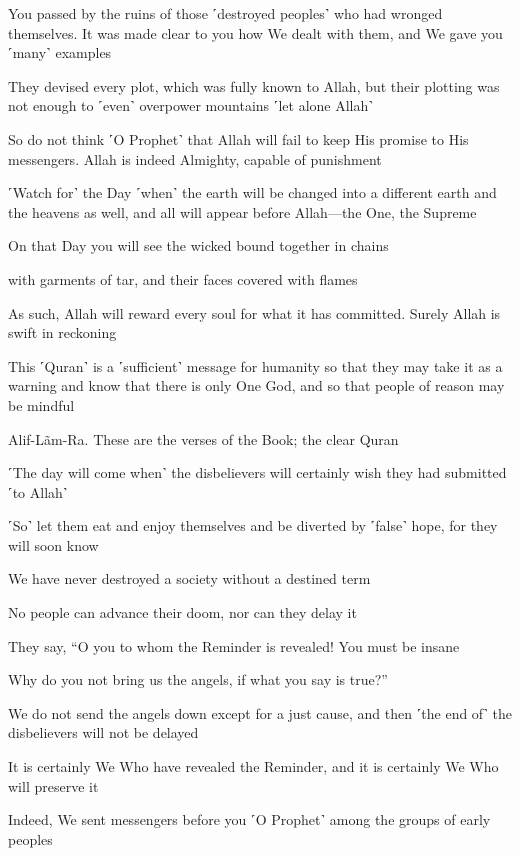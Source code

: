 You passed by the ruins of those ˹destroyed peoples˺ who had wronged themselves. It was made clear to you how We dealt with them, and We gave you ˹many˺ examples

They devised every plot, which was fully known to Allah, but their plotting was not enough to ˹even˺ overpower mountains ˹let alone Allah˺

So do not think ˹O Prophet˺ that Allah will fail to keep His promise to His messengers. Allah is indeed Almighty, capable of punishment

˹Watch for˺ the Day ˹when˺ the earth will be changed into a different earth and the heavens as well, and all will appear before Allah—the One, the Supreme

On that Day you will see the wicked bound together in chains

with garments of tar, and their faces covered with flames

As such, Allah will reward every soul for what it has committed. Surely Allah is swift in reckoning

This ˹Quran˺ is a ˹sufficient˺ message for humanity so that they may take it as a warning and know that there is only One God, and so that people of reason may be mindful

Alif-Lãm-Ra. These are the verses of the Book; the clear Quran

˹The day will come when˺ the disbelievers will certainly wish they had submitted ˹to Allah˺

˹So˺ let them eat and enjoy themselves and be diverted by ˹false˺ hope, for they will soon know

We have never destroyed a society without a destined term

No people can advance their doom, nor can they delay it

They say, “O you to whom the Reminder is revealed! You must be insane

Why do you not bring us the angels, if what you say is true?”

We do not send the angels down except for a just cause, and then ˹the end of˺ the disbelievers will not be delayed

It is certainly We Who have revealed the Reminder, and it is certainly We Who will preserve it

Indeed, We sent messengers before you ˹O Prophet˺ among the groups of early peoples

